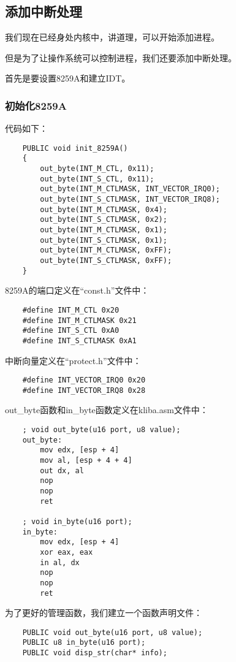 \documentclass[a4paper,left=2.5cm,right=2.5cm,11pt]{article}
\begin{document}
\subsection{添加中断处理}
	我们现在已经身处内核中，讲道理，可以开始添加进程。\par

	但是为了让操作系统可以控制进程，我们还要添加中断处理。\par

	首先是要设置8259A和建立IDT。

\subsubsection{初始化8259A}
	代码如下：
	\begin{lstlisting}
	PUBLIC void init_8259A()
	{
		out_byte(INT_M_CTL, 0x11);
		out_byte(INT_S_CTL, 0x11);
		out_byte(INT_M_CTLMASK, INT_VECTOR_IRQ0);
		out_byte(INT_S_CTLMASK, INT_VECTOR_IRQ8);
		out_byte(INT_M_CTLMASK, 0x4);
		out_byte(INT_S_CTLMASK, 0x2);
		out_byte(INT_M_CTLMASK, 0x1);
		out_byte(INT_S_CTLMASK, 0x1);
		out_byte(INT_M_CTLMASK, 0xFF);
		out_byte(INT_S_CTLMASK, 0xFF);
	}
	\end{lstlisting}

	8259A的端口定义在“const.h”文件中：
	\begin{lstlisting}
	#define INT_M_CTL 0x20
	#define INT_M_CTLMASK 0x21
	#define INT_S_CTL 0xA0
	#define INT_S_CTLMASK 0xA1
	\end{lstlisting}

	中断向量定义在“protect.h”文件中：
	\begin{lstlisting}
	#define INT_VECTOR_IRQ0 0x20
	#define INT_VECTOR_IRQ8 0x28
	\end{lstlisting}

	out\_byte函数和in\_byte函数定义在kliba.asm文件中：
	\begin{lstlisting}
	; void out_byte(u16 port, u8 value);
	out_byte:
		mov edx, [esp + 4]
		mov al, [esp + 4 + 4]
		out dx, al
		nop
		nop
		ret
	
	; void in_byte(u16 port);
	in_byte:
		mov edx, [esp + 4]
		xor eax, eax
		in al, dx
		nop
		nop
		ret
	\end{lstlisting}

	为了更好的管理函数，我们建立一个函数声明文件：
	\begin{lstlisting}
	PUBLIC void out_byte(u16 port, u8 value);
	PUBLIC u8 in_byte(u16 port);
	PUBLIC void disp_str(char* info);
	\end{lstlisting}
\end{document}
